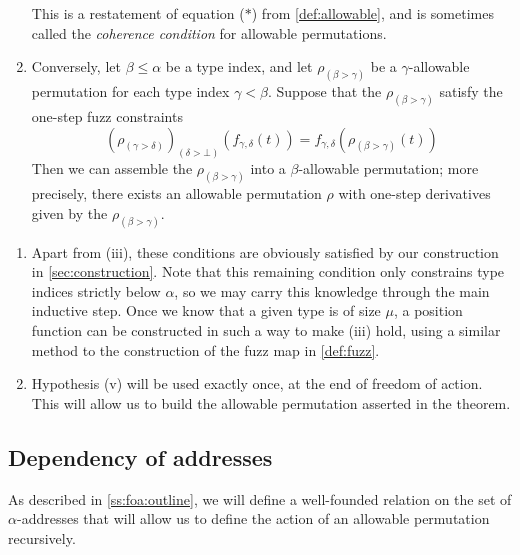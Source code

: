 \begin{enumerate}
    This is a restatement of equation (\( \ast \)) from \cref{def:allowable}, and is sometimes called the \emph{coherence condition} for allowable permutations.
    \item Conversely, let \( \beta \leq \alpha \) be a type index, and let \( \rho_{(\beta > \gamma)} \) be a \( \gamma \)-allowable permutation for each type index \( \gamma < \beta \).
    Suppose that the \( \rho_{(\beta > \gamma)} \) satisfy the one-step fuzz constraints
    \[ (\rho_{(\gamma >\delta)})_{(\delta > \bot)}(f_{\gamma,\delta}(t)) = f_{\gamma,\delta}(\rho_{(\beta > \gamma)}(t)) \]
    Then we can assemble the \( \rho_{(\beta > \gamma)} \) into a \( \beta \)-allowable permutation; more precisely, there exists an allowable permutation \( \rho \) with one-step derivatives given by the \( \rho_{(\beta > \gamma)} \).
\end{enumerate}

\begin{remarks}\mbox{\negthinspace}
    \begin{enumerate}
        \item Apart from (iii), these conditions are obviously satisfied by our construction in \cref{sec:construction}.
        Note that this remaining condition only constrains type indices strictly below \( \alpha \), so we may carry this knowledge through the main inductive step.
        Once we know that a given type is of size \( \mu \), a position function can be constructed in such a way to make (iii) hold, using a similar method to the construction of the fuzz map in \cref{def:fuzz}.
        \item Hypothesis (v) will be used exactly once, at the end of freedom of action.
        This will allow us to build the allowable permutation asserted in the theorem.
    \end{enumerate}
\end{remarks}

\subsection{Dependency of addresses}

As described in \cref{ss:foa:outline}, we will define a well-founded relation on the set of \( \alpha \)-addresses that will allow us to define the action of an allowable permutation recursively.

